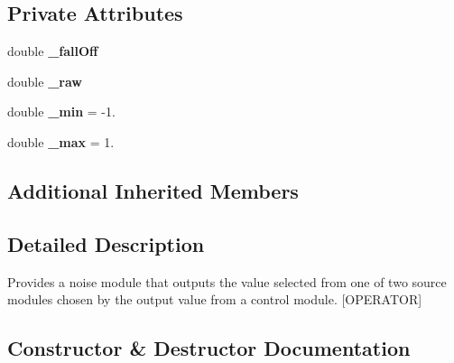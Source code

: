 \subsection*{Private Attributes}
\begin{DoxyCompactItemize}
\item 
\mbox{\label{class_lib_noise_1_1_operator_1_1_select_a9f5cc5c505e98efd8301142e10a45c7d}} 
double {\bfseries \+\_\+fall\+Off}
\item 
\mbox{\label{class_lib_noise_1_1_operator_1_1_select_a5a5bcc94d9875251c3fe9c91b74e8b13}} 
double {\bfseries \+\_\+raw}
\item 
\mbox{\label{class_lib_noise_1_1_operator_1_1_select_af03f42298e811c62005748e99a7fd6e2}} 
double {\bfseries \+\_\+min} = -\/1.
\item 
\mbox{\label{class_lib_noise_1_1_operator_1_1_select_abd22363430aed16e3cc1c65cd9c33d68}} 
double {\bfseries \+\_\+max} = 1.
\end{DoxyCompactItemize}
\subsection*{Additional Inherited Members}


\subsection{Detailed Description}
Provides a noise module that outputs the value selected from one of two source modules chosen by the output value from a control module. \mbox{[}O\+P\+E\+R\+A\+T\+OR\mbox{]} 



\subsection{Constructor \& Destructor Documentation}
\mbox{\label{class_lib_noise_1_1_operator_1_1_select_acb4f276703eed6184d9c982d6670191b}} 
